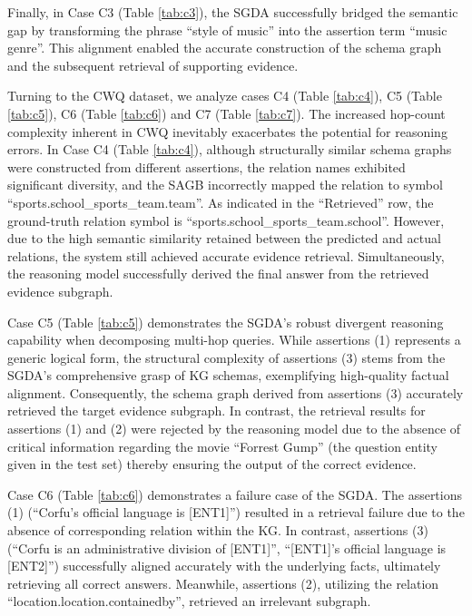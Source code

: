 \documentclass[11pt]{article}
\begin{document}
Finally, in Case C3 (Table \ref{tab:c3}), the SGDA successfully bridged the semantic gap by transforming the phrase ``style of music'' into the assertion term ``music genre''. This alignment enabled the accurate construction of the schema graph and the subsequent retrieval of supporting evidence.

Turning to the CWQ dataset, we analyze cases C4 (Table \ref{tab:c4}), C5 (Table \ref{tab:c5}), C6 (Table \ref{tab:c6}) and C7 (Table \ref{tab:c7}). The increased hop-count complexity inherent in CWQ inevitably exacerbates the potential for reasoning errors. In Case C4 (Table \ref{tab:c4}), although structurally similar schema graphs were constructed from different assertions, the relation names exhibited significant diversity, and the SAGB incorrectly mapped the relation to symbol ``sports.school\_sports\_team.team''. As indicated in the ``Retrieved'' row, the ground-truth relation symbol is ``sports.school\_sports\_team.school''. However, due to the high semantic similarity retained between the predicted and actual relations, the system still achieved accurate evidence retrieval. Simultaneously, the reasoning model successfully derived the final answer from the retrieved evidence subgraph.

Case C5 (Table \ref{tab:c5}) demonstrates the SGDA's robust divergent reasoning capability when decomposing multi-hop queries. While assertions (1) represents a generic logical form, the structural complexity of assertions (3) stems from the SGDA's comprehensive grasp of KG schemas, exemplifying high-quality factual alignment. Consequently, the schema graph derived from assertions (3) accurately retrieved the target evidence subgraph. In contrast, the retrieval results for assertions (1) and (2) were rejected by the reasoning model due to the absence of critical information regarding the movie ``Forrest Gump'' (the question entity given in the test set) thereby ensuring the output of the correct evidence.

Case C6 (Table \ref{tab:c6}) demonstrates a failure case of the SGDA. The assertions (1) (``Corfu's official language is [ENT1]'') resulted in a retrieval failure due to the absence of corresponding relation within the KG. In contrast, assertions (3) (``Corfu is an administrative division of [ENT1]'', ``[ENT1]’s official language is [ENT2]'') successfully aligned accurately with the underlying facts, ultimately retrieving all correct answers. Meanwhile, assertions (2), utilizing the relation ``location.location.containedby'', retrieved an irrelevant subgraph. 
\end{document}
